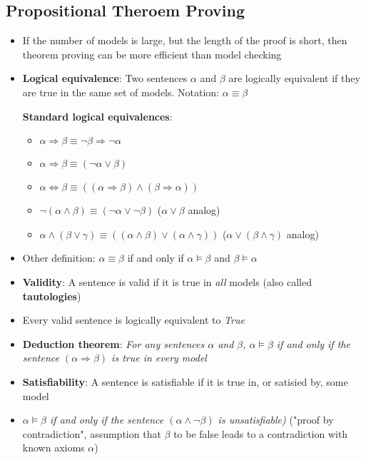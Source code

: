 \documentclass{scrartcl}
\begin{document}
\subsection{Propositional Theroem Proving}
\begin{itemize}
    \item
        If the number of models is large, but the length of the proof is short, then theorem proving can be more efficient than model checking 
    \item
        \textbf{Logical equivalence}: Two sentences $\alpha$ and $\beta$ are logically  equivalent if they are true in the same set of models. Notation: $\alpha \equiv \beta$

    \textbf{Standard logical equivalences}:
    \label{logEqui}
    \begin{itemize}
        \item
            $\alpha \Rightarrow \beta \equiv \lnot \beta \Rightarrow \lnot \alpha$
        \item
             $\alpha \Rightarrow \beta \equiv (\lnot \alpha \lor \beta)$
        \item
            $\alpha \Leftrightarrow \beta \equiv ((\alpha \Rightarrow \beta) \land (\beta \Rightarrow \alpha))$
        \item
            $\lnot (\alpha \land \beta) \equiv (\lnot \alpha \lor \lnot \beta)$ ($\alpha \lor \beta$ analog)
        \item
            $\alpha \land (\beta \lor \gamma) \equiv ((\alpha \land \beta) \lor (\alpha \land \gamma))$  ($\alpha \lor (\beta \land \gamma)$ analog)
    \end{itemize} 
    \item
        Other definition: $\alpha \equiv \beta$ if and only if $\alpha \vDash \beta$ and $\beta \vDash \alpha$
    \item
        \textbf{Validity}: A sentence is valid if it is true in \textit{all} models (also called \textbf{tautologies})
    \item
        Every valid sentence is logically equivalent to \textit{True}
    \item
        \textbf{Deduction theorem}: \textit{For any sentences $\alpha$ and $\beta$, $\alpha \vDash \beta$ if and only if the sentence $(\alpha \Rightarrow \beta)$ is true in every model}
    \item
        \textbf{Satisfiability}: A sentence is satisfiable if it is true in, or satisied by, some model
    \item
        \textit{$\alpha \vDash \beta$ if and only if the sentence $(\alpha \land \lnot \beta)$ is unsatisfiable)} ("proof by contradiction", assumption that $\beta$ to be false leads to a contradiction with known axioms $\alpha$)
\end{itemize}
\end{document}
